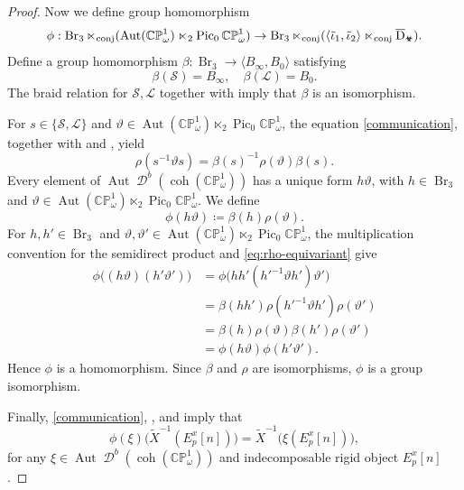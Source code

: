 \documentclass[11pt,a4paper,reqno]{amsart}%
\theoremstyle{plain}
\theoremstyle{definition}
\numberwithin{equation}{section}
\numberwithin{equation}{section}
\def\<{\langle}
\def\>{\rangle}
\newcommand{\D}{\operatorname{\mathcal{D}}}
\newcommand{\Pic}{\operatorname{Pic}\nolimits}
\def\wt{\omega}
\def\coh{\operatorname{coh}}
\def\Aut{\operatorname{Aut}}
\def\Br{\operatorname{Br}}
\newcommand{\tubR}{\mathcal{S}}
\newcommand{\tubL}{\mathcal{L}}
\def\coh{\operatorname{coh}}
\def\CPone{\mathbb{CP}^1_{\wt}}
\newcommand\DC[1]{\D^b(\coh(#1))}
\def\wX{\widetilde{X}}
\def\vot{\text{\Biohazard}}
\begin{document}
\begin{proof}
Now we define group  homomorphism
\[
\phi :\Br_3\ltimes_{\rm conj}(\Aut(\CPone) \ltimes_2 \Pic_0\CPone)\to \Br_3\ltimes_{\rm conj}(\langle\tilde\iota_1,\tilde\iota_2\rangle \ltimes_{\rm conj}\overline{\mathrm{D}}_{\vot}).
\]
Define a  group  homomorphism $\beta:\Br_3\longrightarrow\<B_\infty,B_0\>$ satisfying
\[
\beta(\tubR)=B_\infty,\quad \beta(\tubL)=B_0.
\]
The braid relation for $\tubR,\tubL$  together with
  imply that  $\beta$ is an isomorphism. 
 
For
$s\in\{\tubR,\tubL\}$ and $\vartheta\in \Aut(\CPone) \ltimes_2 \Pic_0\CPone$, the equation
\eqref{communication}, together with
 and , yield
\begin{equation}\label{eq:rho-equivariant}
\rho(s^{-1}\vartheta s)
=\beta(s)^{-1}\rho(\vartheta)\beta(s).
\end{equation}
Every element of $\Aut\DC{\CPone}$ has a unique form $h\vartheta$, with
$h\in\Br_3$ and $\vartheta\in \Aut(\CPone) \ltimes_2 \Pic_0\CPone$. We define
\begin{equation}\label{eq:phi-normal-form}
\phi(h\vartheta)\coloneqq\beta(h)\rho(\vartheta).
\end{equation}
For $h,h'\in\Br_3$ and $\vartheta,\vartheta'\in \Aut(\CPone) \ltimes_2 \Pic_0\CPone$, the multiplication
convention for the semidirect product and \eqref{eq:rho-equivariant} give
\[
\begin{aligned}
\phi\bigl((h\vartheta)(h'\vartheta')\bigr)
&=\phi\bigl(hh'(h'^{-1}\vartheta h')\vartheta'\bigr)\\
&=\beta(hh')\rho(h'^{-1}\vartheta h')\rho(\vartheta')\\
&=\beta(h)\rho(\vartheta)\beta(h')\rho(\vartheta')\\
&=\phi(h\vartheta)\phi(h'\vartheta').
\end{aligned}
\]
Hence $\phi$ is a homomorphism. Since $\beta$ and $\rho$ are isomorphisms, $\phi$ is a group isomorphism.

Finally, \eqref{communication},
, and
 imply  that
\[
\phi(\xi)\bigl(\wX^{-1}(E_p^x[n])\bigr)
=\wX^{-1}\bigl(\xi(E_p^x[n])\bigr),
\] for
 any $\xi\in\Aut\DC{\CPone}$    and  indecomposable rigid object $E_p^x[n]$.
\end{proof}


 
 

  
 
\end{document}

